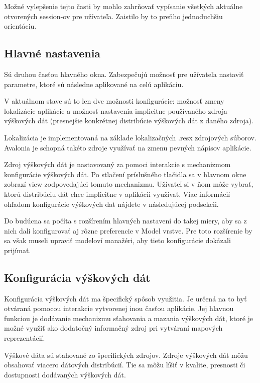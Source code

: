 Možné vylepšenie tejto časti by mohlo zahrňovať vypísanie všetkých aktuálne otvorených session-ov pre užívateľa. Zaistilo by to preňho jednoduchšiu orientáciu.

\subsection{Hlavné nastavenia}

Sú druhou časťou hlavného okna. Zabezpečujú možnosť pre užívateľa nastaviť parametre, ktoré sú následne aplikované na celú aplikáciu. 

V aktuálnom stave sú to len dve možnosti konfigurácie: možnosť zmeny lokalizácie aplikácie a možnosť nastavenia implicitne používaného zdroja výškových dát (presnejšie konkrétnej distribúcie výškových dát z daného zdroja). 

Lokalizácia je implementovaná na základe lokalizačných .resx zdrojových súborov. Avalonia je schopná takéto zdroje využívať na zmenu pevných nápisov aplikácie.

Zdroj výškových dát je nastavovaný za pomoci interakcie s mechanizmom konfigurácie výškových dát. Po stlačení príslušného tlačidla sa v hlavnom okne zobrazí view zodpovedajúci tomuto mechanizmu. Užívateľ si v ňom môže vybrať, ktorú distribúciu dát chce implicitne v aplikácii využívať. Viac informácií ohľadom konfigurácie výškových dat nájdete v následujúcej podsekcii.

Do budúcna sa počíta s rozšírením hlavných nastavení do takej miery, aby sa z nich dali konfigurovať aj rôzne preferencie v Model vrstve. Pre toto rozšírenie by sa však museli upraviť modeloví manažéri, aby tieto konfigurácie dokázali prijímať.

\subsection{Konfigurácia výškových dát}\label{konfiguracia_vyskovych_dat}

Konfigurácia výškových dát ma špecifický spôsob využitia. Je určená na to byť otváraná pomocou interakcie vytvorenej inou časťou aplikácie. Jej hlavnou funkciou je dodávanie mechanizmu sťahovania a mazania výškových dát, ktoré je možné využiť ako dodatočný informačný zdroj pri vytváraní mapových reprezentácií. 

Výškové dáta sú sťahované zo špecifických zdrojov. Zdroje výškových dát môžu obsahovať viacero dátových distribúcií. Tie sa môžu líšiť v kvalite, presnosti či dostupnosti dodávaných výškových dát. 

